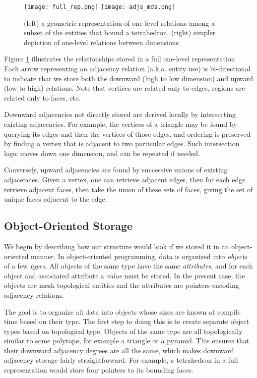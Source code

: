 \begin{figure}
\begin{center}
\texttt{[image: full\_rep.png]}
\quad
\texttt{[image: adjs\_mds.png]}
\caption{(left) a geometric representation of one-level
relations among a subset of the entities that bound a tetrahedron.
(right) simpler depiction of one-level relations between dimensions}
\label{fig:topo}
\end{center}
\end{figure}

Figure \ref{fig:topo} illustrates the relationships
stored in a full one-level representation.
Each arrow representing an adjacency relation (a.k.a. entity use)
is bi-directional to indicate that we store both the
downward (high to low dimension) and upward (low to high) relations.
Note that vertices are related only to edges,
regions are related only to faces, etc.

Downward adjacencies not directly stored are derived
locally by intersecting existing adjacencies.
For example, the vertices of a triangle may be found
by querying its edges and then the vertices of those
edges, and ordering is preserved by finding a vertex
that is adjacent to two particular edges.
Such intersection logic moves down one dimension, and
can be repeated if needed.

Conversely, upward adjacencies are found by successive
unions of existing adjacencies.
Given a vertex, one can retrieve adjacent edges, then
for each edge retrieve adjacent faces, then take the
union of these sets of faces, giving the set of unique
faces adjacent to the edge.

\subsection{Object-Oriented Storage}
\label{sec:sisc_oo}

We begin by describing how our structure would look
if we stored it in an object-oriented manner.
In object-oriented programming, data is organized
into {\it objects} of a few {\it types}.
All objects of the same type have the same {\it attributes},
and for each object and associated attribute a {\it value} must be stored.
In the present case, the objects are mesh topological entities
and the attributes are pointers encoding adjacency relations.

The goal is to organize all data into objects whose
sizes are known at compile time based on their type.
The first step to doing this is to create separate object types
based on topological type.
Objects of the same type are all topologically similar to some polytope,
for example a triangle or a pyramid.
This ensures that their downward adjacency degrees are all the same,
which makes downward adjacency storage fairly straightforward.
For example, a tetrahedron in a full representation would store
four pointers to its bounding faces.

